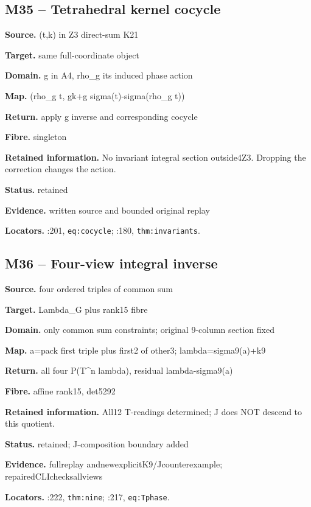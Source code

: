 \subsection*{M35 -- Tetrahedral kernel cocycle}
\noindent\textbf{Source.} (t,k) in Z3 direct-sum K21\par
\noindent\textbf{Target.} same full-coordinate object\par
\noindent\textbf{Domain.} g in A4, rho\_g its induced phase action\par
\noindent\textbf{Map.} (rho\_g t, gk+g sigma(t)-sigma(rho\_g t))\par
\noindent\textbf{Return.} apply g inverse and corresponding cocycle\par
\noindent\textbf{Fibre.} singleton\par
\noindent\textbf{Retained information.} No invariant integral section outside4Z3. Dropping the correction changes the action.\par
\noindent\textbf{Status.} retained\par
\noindent\textbf{Evidence.} written source and bounded original replay\par
\noindent\textbf{Locators.} :201, \texttt{eq:cocycle}; :180, \texttt{thm:invariants}.
\subsection*{M36 -- Four-view integral inverse}
\noindent\textbf{Source.} four ordered triples of common sum\par
\noindent\textbf{Target.} Lambda\_G plus rank15 fibre\par
\noindent\textbf{Domain.} only common sum constraints; original 9-column section fixed\par
\noindent\textbf{Map.} a=pack first triple plus first2 of other3; lambda=sigma9(a)+k9\par
\noindent\textbf{Return.} all four P(T\textasciicircum{}n lambda), residual lambda-sigma9(a)\par
\noindent\textbf{Fibre.} affine rank15, det5292\par
\noindent\textbf{Retained information.} All12 T-readings determined; J does NOT descend to this quotient.\par
\noindent\textbf{Status.} retained; J-composition boundary added\par
\noindent\textbf{Evidence.} fullreplay andnewexplicitK9/Jcounterexample; repairedCLIchecksallviews\par
\noindent\textbf{Locators.} :222, \texttt{thm:nine}; :217, \texttt{eq:Tphase}.
